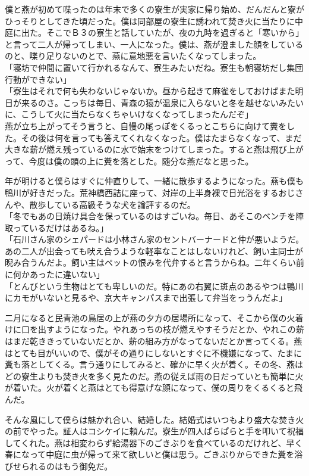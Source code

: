   僕と燕が初めて喋ったのは年末で多くの寮生が実家に帰り始め、だんだんと寮がひっそりとしてきた頃だった。僕は同部屋の寮生に誘われて焚き火に当たりに中庭に出た。そこでＢ３の寮生と話していたが、夜の九時を過ぎると「寒いから」と言って二人が帰ってしまい、一人になった。僕は、燕が澄ました顔をしているのと、喋り足りないのとで、燕に意地悪を言いたくなってしまった。\\
  「寝坊で仲間に置いて行かれるなんて、寮生みたいだね。寮生も朝寝坊だし集団行動ができない」\\
  「寮生はそれで何も失わないじゃないか。昼から起きて麻雀をしておけばまた明日が来るのさ。こっちは毎日、青森の猿が温泉に入らないと冬を越せないみたいに、こうして火に当たらなくちゃいけなくなってしまったんだぞ」\\
  燕が立ち上がってそう言うと、自慢の尾っぽをくるっとこちらに向けて糞をした。その後は何を言っても答えてくれなくなった。僕はたまらなくなって、まだ大きな薪が燃え残っているのに水で始末をつけてしまった。すると燕は飛び上がって、今度は僕の頭の上に糞を落とした。随分な燕だなと思った。

  年が明けると僕らはすぐに仲直りして、一緒に散歩するようになった。燕も僕も鴨川が好きだった。荒神橋西詰に座って、対岸の上半身裸で日光浴をするおじさんや、散歩している高級そうな犬を論評するのだ。\\
  「冬でもあの日焼け具合を保っているのはすごいね。毎日、あそこのベンチを陣取っているだけはあるね。」\\
  「石川さん家のシェパードは小林さん家のセントバーナードと仲が悪いようだ。あの二人が出会っても吠え合うような軽率なことはしないけれど、飼い主同士が睨み合うんだよ。飼い主はペットの恨みを代弁すると言うからね。二年くらい前に何かあったに違いない」\\
  「とんびという生物はとても卑しいのだ。特にあの右翼に斑点のあるやつは鴨川にカモがいないと見るや、京大キャンパスまで出張して弁当をっうんだよ」

  二月になると民青池の鳥居の上が燕の夕方の居場所になって、そこから僕の火着けに口を出すようになった。やれあっちの枝が燃えやすそうだとか、やれこの薪はまだ乾ききっていないだとか、薪の組み方がなってないだとか言ってくる。燕はとても目がいいので、僕がその通りにしないとすぐに不機嫌になって、たまに糞も落としてくる。言う通りにしてみると、確かに早く火が着く。その冬、燕はどの寮生よりも焚き火を多く見たのだ。燕の従えば雨の日だっていとも簡単に火が着いた。火が着くと燕はとても得意げな顔になって、僕の周りをくるくると飛んだ。

  そんな風にして僕らは魅かれ合い、結婚した。結婚式はいつもより盛大な焚き火の前でやった。証人はコシケイに頼んだ。寮生が四人ぱらぱらと手を叩いて祝福してくれた。燕は相変わらず給湯器下のごきぶりを食べているのだけれど、早く春になって中庭に虫が帰って来て欲しいと僕は思う。ごきぶりからできた糞を浴びせられるのはもう御免だ。



